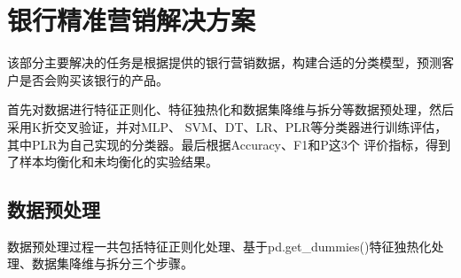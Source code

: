 \documentclass{acm_proc_article-sp}
\begin{document}
\maketitle






\section{\textsf{银行精准营销解决方案}}
该部分主要解决的任务是根据提供的银行营销数据，构建合适的分类模型，预测客户是否会购买该银行的产品。

首先对数据进行特征正则化、特征独热化和数据集降维与拆分等数据预处理，然后采用K折交叉验证，并对MLP、
SVM、DT、LR、PLR等分类器进行训练评估，其中PLR为自己实现的分类器。最后根据Accuracy、F1和P这3个
评价指标，得到了样本均衡化和未均衡化的实验结果。

\subsection{\textsf{数据预处理}}
数据预处理过程一共包括特征正则化处理、基于pd.get\_dummies()特征独热化处理、数据集降维与拆分三个步骤。
\end{document}
